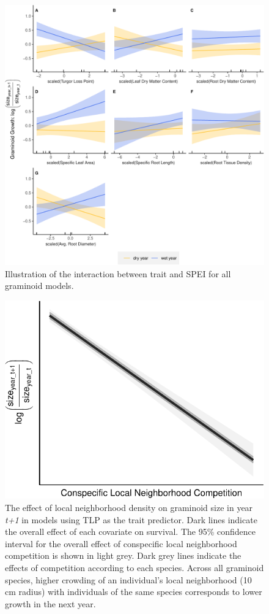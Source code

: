 \documentclass[12pt, letterpaper]{article}
\begin{document}
\begin{figure}
\includegraphics[width=1\textwidth]{figures/supGramGrowthPlots-1.pdf}
\caption{\small{
Illustration of the interaction between trait and SPEI for all graminoid models.
}}
\label{fig:Growth_all}
\end{figure}

\begin{figure}
    \centering
    \includegraphics[width=.9\textwidth]{figures/growthEffectPlots-1.pdf}
    \caption{The effect of local neighborhood density on graminoid size in year \textit{t+1} in models using TLP as the trait predictor. Dark lines indicate the overall effect of each covariate on survival. The 95\% confidence interval for the overall effect of conspecific local neighborhood competition is shown in light grey. Dark grey lines indicate the effects of competition according to each species. Across all graminoid species, higher crowding of an individual's local neighborhood (10 cm radius) with individuals of the same species corresponds to lower growth in the next year.}
    \label{fig:Effects_Growth}
\end{figure}
\end{document}
